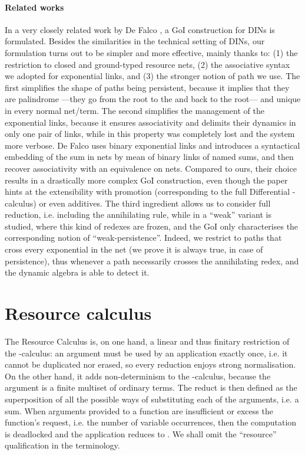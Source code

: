 \paragraph{Related works}
In a very closely related work by De Falco \cite{DeFalco:2008}, a GoI 
construction for DINs is formulated.
Besides the similarities in the technical setting of DINs, our formulation 
turns out to be simpler and more effective, mainly thanks to:
(1) the restriction to closed and ground-typed resource nets,
(2) the associative syntax we adopted for exponential links, and
(3) the stronger notion of path we use.
The first simplifies the shape of paths being persistent, because it implies 
that they are palindrome ---they go from the root to the  and back to 
the root--- and unique in every normal net/term.
The second simplifies the management of the exponential links, because 
it ensures associativity and delimits their dynamics in only one pair of links, 
while in \cite{DeFalco:2008} this property was completely lost and the system 
more verbose.
De Falco uses binary exponential links and introduces a syntactical embedding 
of the sum in nets by mean of binary links of named sums, and then recover 
associativity with an equivalence on nets.
Compared to ours, their choice results in a drastically more complex 
GoI construction, even though the paper hints at the extensibility with 
promotion (corresponding to the full Differential -calculus) or even 
additives.
The third ingredient allows us to consider full reduction, 
i.e. including the annihilating rule, while in \cite{DeFalco:2008} a 
``weak'' variant is studied, where this kind of redexes are frozen, and 
the GoI only characterises the corresponding notion of ``weak-persistence''.
Indeed, we restrict to paths that cross every exponential in the net (we 
prove it is always true, in case of persistence), thus whenever  
a path necessarily crosses the annihilating redex, and the dynamic algebra is 
able to detect it.

\section{Resource calculus}
\label{sec:terms}

The Resource Calculus is, on one hand, a linear and thus finitary restriction 
of the -calculus: an argument  must be used by an application 
 exactly once, i.e. it cannot be duplicated nor erased, so every 
reduction enjoys strong normalisation.
On the other hand, it adds non-determinism to the -calculus, because 
the argument is a finite multiset of ordinary terms.
The reduct is then defined as the superposition of all the possible ways of 
substituting each of the arguments, i.e. a sum.
When arguments provided to a function are insufficient or excess the 
function's request, i.e. the number of variable occurrences, then the 
computation is deadlocked and the application reduces to .
We shall omit the ``resource'' qualification in the terminology.

